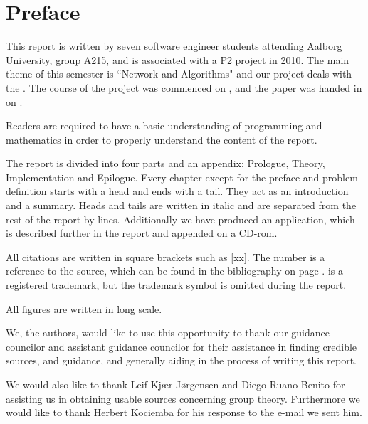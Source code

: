 \chapter*{Preface}
%
\emptyTop{}%
\vspace{-15mm}%
This report is written by seven software engineer students attending Aalborg University, group A215, and is associated with a P2 project in 2010.
The main theme of this semester is ``Network and Algorithms" and our project deals with the \rubik{}.
The course of the project was commenced on , and the paper was handed in on .

Readers are required to have a basic understanding of programming and mathematics in order to properly understand the content of the report. 

The report is divided into four parts and an appendix; Prologue, Theory, Implementation and Epilogue. Every chapter except for the preface and problem definition starts with a head and ends with a tail. They act as an introduction and a summary. Heads and tails are written in italic and are separated from the rest of the report by lines. 
Additionally we have produced an application, which is described further in the report and appended on a CD-rom.

All citations are written in square brackets such as [xx]. The number is a reference to the source, which can be found in the bibliography on page \pageref{chap:bib}. 
\rubik{} is a registered trademark, but the trademark symbol is omitted during the report.

All figures are written in long scale.%

We, the authors, would like to use this opportunity to thank our guidance councilor and assistant guidance councilor for their assistance in finding credible sources, and guidance, and generally aiding in the process of writing this report. 

We would also like to thank Leif Kj\ae{}r J\o{}rgensen and Diego Ruano Benito for assisting us in obtaining usable sources concerning group theory.
Furthermore we would like to thank Herbert Kociemba for his response to the e-mail we sent him.
